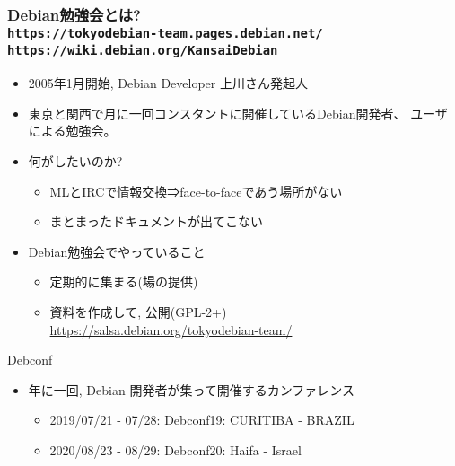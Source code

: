 \documentclass[cjk,c,squeeze,shrink,dvipdfmx,12pt]{beamer}
\begin{document}
\begin{frame}
  \frametitle{Debian勉強会とは?%
    \\[-.5em]{\normalsize{\texttt{https://tokyodebian-team.pages.debian.net/}}}%
    \\[-.5em]{\normalsize{\texttt{https://wiki.debian.org/KansaiDebian}}}%
  }
  \pause
  \begin{itemize}[<+->]
  \item
    2005年1月開始, Debian Developer 上川さん発起人
  \item
    東京と関西で月に一回コンスタントに開催しているDebian開発者、
    ユーザによる勉強会。
  \item
    何がしたいのか?
    \begin{itemize}[<+->]
    \item
      MLとIRCで情報交換⇒face-to-faceであう場所がない
    \item
      まとまったドキュメントが出てこない
    \end{itemize}
  \item
    Debian勉強会でやっていること
    \begin{itemize}[<+->]
    \item
      定期的に集まる(場の提供)
    \item
      資料を作成して, 公開(GPL-2+) \\
      {\small \url{https://salsa.debian.org/tokyodebian-team/}}
    \end{itemize}
  \end{itemize}

\end{frame}

\begin{frame}[fragile]{Debconf}
  \begin{itemize}
  \item 年に一回, Debian 開発者が集って開催するカンファレンス
    \begin{itemize}
      \item 2019/07/21 - 07/28: Debconf19: CURITIBA - BRAZIL
      \item 2020/08/23 - 08/29: Debconf20: Haifa - Israel
    \end{itemize}
  \end{itemize}
  \begin{center}
  \end{center}
\end{frame}
\end{document}
